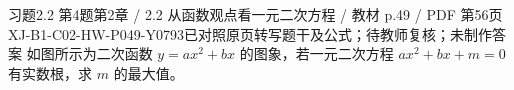 \par\noindent\begin{minipage}{\linewidth}
\begin{bankitem}{习题2.2 第4题}{第2章 / 2.2 从函数观点看一元二次方程 / 教材 p.49 / PDF 第56页}{XJ-B1-C02-HW-P049-Y0793}{已对照原页转写题干及公式；待教师复核；未制作答案}
如图所示为二次函数 $y=ax^2+bx$ 的图象，若一元二次方程 $ax^2+bx+m=0$ 有实数根，求 $m$ 的最大值。
\end{bankitem}
\end{minipage}\par\medskip
